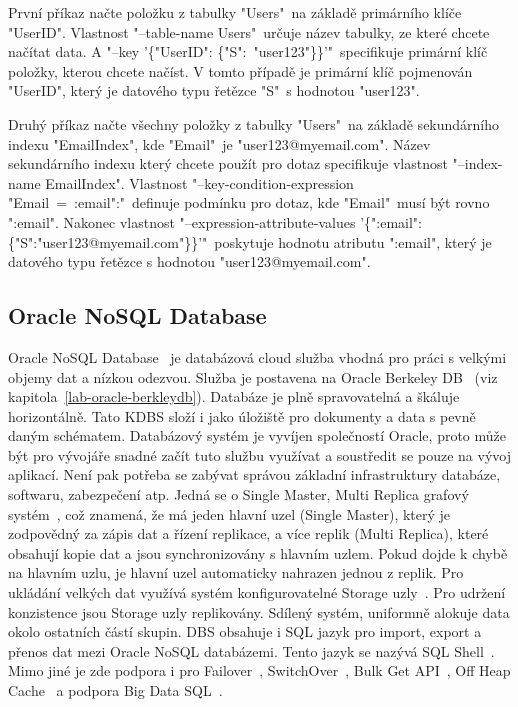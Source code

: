 \documentclass[czech,master,dept460,male,csharp,cpdeclaration]{diploma}
\begin{document}
	První příkaz načte položku z tabulky "Users"~na základě primárního klíče "UserID". Vlastnost "--table-name Users"~určuje název tabulky, ze které chcete načítat data. A "--key '\{"UserID": \{"S":~"user123"\}\}'"~specifikuje primární klíč položky, kterou chcete načíst. V tomto případě je primární klíč pojmenován "UserID", který je datového typu řetězce "S"~s hodnotou "user123". 
	
	Druhý příkaz načte všechny položky z tabulky "Users"~na základě sekundárního indexu "EmailIndex", kde "Email"~je "user123@myemail.com". Název sekundárního indexu který chcete použít pro dotaz specifikuje vlastnost "--index-name EmailIndex". Vlastnost "--key-condition-expression "Email~=~:email":"~definuje podmínku pro dotaz, kde "Email"~musí být rovno ":email". Nakonec vlastnost "--expression-attribute-values '\{":email":\{"S":"user123@myemail.com"\}\}'"~poskytuje hodnotu atributu ":email", který je datového typu řetězce s hodnotou "user123@myemail.com".
	
	\subsection{Oracle NoSQL Database}
	
	Oracle NoSQL Database~\cite{oraclenosqldb} je databázová cloud služba vhodná pro práci s velkými objemy dat a nízkou odezvou. Služba je postavena na Oracle Berkeley DB~\cite{berkeleydb} (viz kapitola~\ref{lab-oracle-berkleydb}). Databáze je plně spravovatelná a škáluje horizontálně. Tato KDBS složí i jako úložiště pro dokumenty a data s pevně daným schématem. Databázový systém je vyvíjen společností Oracle, proto může být pro vývojáře snadné začít tuto službu využívat a soustředit se pouze na vývoj aplikací. Není pak potřeba se zabývat správou základní infrastruktury databáze, softwaru, zabezpečení atp. Jedná se o Single Master, Multi Replica grafový systém~\cite{oracle-singlemaster-multireplica}, což znamená, že má jeden hlavní uzel (Single Master), který je zodpovědný za zápis dat a řízení replikace, a více replik (Multi Replica), které obsahují kopie dat a jsou synchronizovány s hlavním uzlem. Pokud dojde k chybě na hlavním uzlu, je hlavní uzel automaticky nahrazen jednou z replik. Pro ukládání velkých dat využívá systém konfigurovatelné Storage uzly~\cite{oracle-storage-node}. Pro udržení konzistence jsou Storage uzly replikovány. Sdílený systém, uniformně alokuje data okolo ostatních částí skupin. DBS obsahuje i SQL jazyk pro import, export a přenos dat mezi Oracle NoSQL databázemi. Tento jazyk se nazývá SQL Shell~\cite{oracle-sql-shell}. Mimo jiné je zde podpora i pro Failover~\cite{failover}, SwitchOver~\cite{switchover}, Bulk Get API~\cite{oracle-bulkapi}, Off Heap Cache~\cite{offheapcache} a podpora Big Data SQL~\cite{oracle-big-data-sql}.
	
\end{document}
